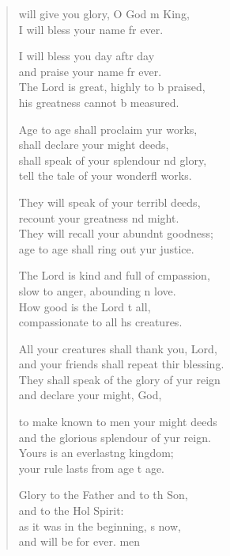 \begin{verse}
  \begin{patverse}
 will give you glory, O God m King, \Med\\
I will bless your name fr ever.

I will bless you day aftr day\Med\\
and praise your name fr ever.\\
The Lord is great, highly to b praised,\Med\\
his greatness cannot b measured.

Age to age shall proclaim yur works,\Med\\
shall declare your might deeds,\\
shall speak of your splendour nd glory,\Med\\
tell the tale of your wonderfl works.

They will speak of your terribl deeds,\Med\\
recount your greatness nd might.\\
They will recall your abundnt goodness;\Med\\
age to age shall ring out yur justice.

The Lord is kind and full of cmpassion,\Med\\
slow to anger, abounding \pointup{\i}n love.\\
How good is the Lord t all,\Med\\
compassionate to all h\pointup{\i}s creatures.

All your creatures shall thank you,  Lord,\Med\\
and your friends shall repeat thir blessing.\\
They shall speak of the glory of yur reign\Med\\
and declare your might,  God,

to make known to men your might deeds\Med\\
and the glorious splendour of yur reign.\\
Yours is an everlast\pointup{\i}ng kingdom;\Med\\
your rule lasts from age t age.

Glory to the Father and to th Son,\Med\\
and to the Hol Spirit:\\
as it was in the beginning, \pointup{\i}s now,\Med\\
and will be for ever. men
  \end{patverse}
\end{verse}
